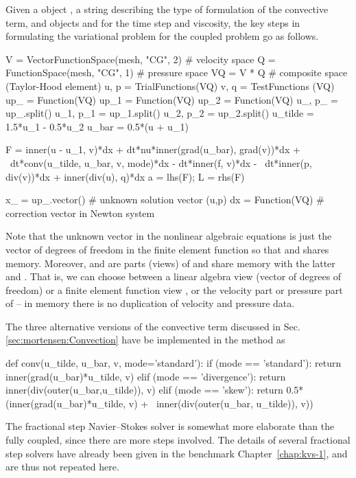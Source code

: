 Given a  object , a string  describing
the type of formulation of the convective term, and 
objects  and  for the time step and viscosity, the key
steps in formulating the variational problem for the coupled problem
go as follows.
\begin{python}
V = VectorFunctionSpace(mesh, "CG", 2)  # velocity space
Q = FunctionSpace(mesh, "CG", 1)        # pressure space
VQ = V * Q  # composite space (Taylor-Hood element)
u, p = TrialFunctions(VQ)
v, q = TestFunctions (VQ)
up_  = Function(VQ)
up_1 = Function(VQ)
up_2 = Function(VQ)
u_, p_ = up_.split()
u_1, p_1 = up_1.split()
u_2, p_2 = up_2.split()
u_tilde = 1.5*u_1 - 0.5*u_2
u_bar = 0.5*(u + u_1)

F  = inner(u - u_1, v)*dx + dt*nu*inner(grad(u_bar), grad(v))*dx + \
     dt*conv(u_tilde, u_bar, v, mode)*dx - dt*inner(f, v)*dx - \
     dt*inner(p, div(v))*dx + inner(div(u), q)*dx
a = lhs(F); L = rhs(F)

x_ = up_.vector()  # unknown solution vector (u,p)
dx = Function(VQ)  # correction vector in Newton system
\end{python}
Note that the unknown vector  in the nonlinear algebraic
equations is just the vector of degrees of freedom in the 
finite element function so that \emp{up\_} and  shares
memory. Moreover, \emp{u\_} and \emp{p\_} are parts (views) of
 and share memory with the latter and \emp{x\_}.  That is,
we can choose between a linear algebra view \emp{x\_} (vector of
degrees of freedom) or a finite element function view , or
the velocity part \emp{u\_} or pressure part \emp{p\_} of \emp{up\_}
-- in memory there is no duplication of velocity and pressure data.

The three alternative versions of the convective term discussed in
Sec. \ref{sec:mortensen:Convection} have be implemented in the method
\emp{conv} as
\begin{python}
def conv(u_tilde, u_bar, v, mode='standard'):
    if (mode == 'standard'):
        return inner(grad(u_bar)*u_tilde, v)
    elif (mode == 'divergence'):
        return inner(div(outer(u_bar,u_tilde)), v)
    elif (mode == 'skew'):
        return 0.5*(inner(grad(u_bar)*u_tilde, v) + \
        inner(div(outer(u_bar, u_tilde)), v))
\end{python}
The fractional step Navier--Stokes solver is somewhat more elaborate
than the fully coupled, since there are more steps involved. The
details of several fractional step solvers have already been given in
the benchmark Chapter~\ref{chap:kvs-1}, and are thus not repeated here.

